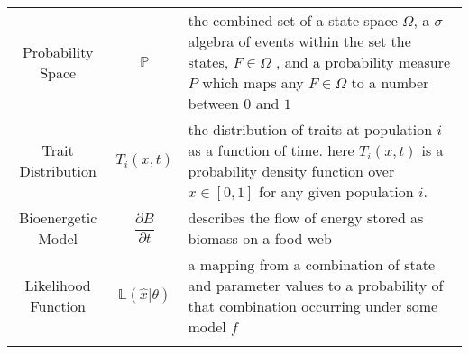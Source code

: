 \begin{longtable}[]{@{}ccl@{}}
\begin{minipage}[t]{0.25\columnwidth}
Probability Space\strut
\end{minipage} & \begin{minipage}[t]{0.23\columnwidth}\centering
\(\mathbb{P}\)\strut
\end{minipage} & \begin{minipage}[t]{0.42\columnwidth}\raggedright
the combined set of a state space \(\Omega\), a \(\sigma\)-algebra of
events within the set the states, \({F} \in \Omega\) , and a probability
measure \(P\) which maps any \({F} \in \Omega\) to a number between
\(0\) and \(1\)\strut
\end{minipage}\tabularnewline
\begin{minipage}[t]{0.25\columnwidth}\centering
Trait Distribution\strut
\end{minipage} & \begin{minipage}[t]{0.23\columnwidth}\centering
\(T_i(x,t)\)\strut
\end{minipage} & \begin{minipage}[t]{0.42\columnwidth}\raggedright
the distribution of traits at population \(i\) as a function of time.
here \(T_i(x,t)\) is a probability density function over \(x \in [0,1]\)
for any given population \(i\).\strut
\end{minipage}\tabularnewline
\begin{minipage}[t]{0.25\columnwidth}\centering
Bioenergetic Model\strut
\end{minipage} & \begin{minipage}[t]{0.23\columnwidth}\centering
\[\frac{\partial B}{\partial t}\]\strut
\end{minipage} & \begin{minipage}[t]{0.42\columnwidth}\raggedright
describes the flow of energy stored as biomass on a food web\strut
\end{minipage}\tabularnewline
\begin{minipage}[t]{0.25\columnwidth}\centering
Likelihood Function\strut
\end{minipage} & \begin{minipage}[t]{0.23\columnwidth}\centering
\(\mathbb{L}(\hat{x} | \theta)\)\strut
\end{minipage} & \begin{minipage}[t]{0.42\columnwidth}\raggedright
a mapping from a combination of state and parameter values to a
probability of that combination occurring under some model \(f\)\strut
\end{minipage}\tabularnewline
\begin{minipage}[t]{0.25\columnwidth}\centering

\end{minipage}
\end{longtable}
